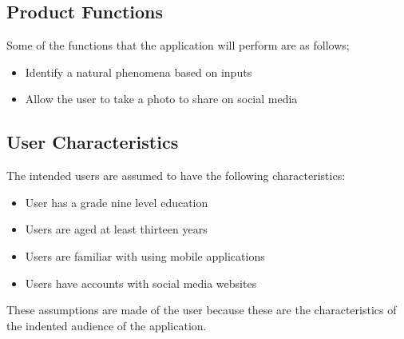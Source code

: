 \documentclass[]{article}
\begin{document}
\subsection{Product Functions}
\label{sub:product_functions}
Some of the functions that the application will perform are as follows;
\begin{itemize}
\item Identify a natural phenomena based on inputs
\item Allow the user to take a photo to share on social media
\end{itemize}

\subsection{User Characteristics}
\label{sub:user_characteristics}
The intended users are assumed to have the following characteristics:
\begin{itemize}
	\item User has a grade nine level education
	\item Users are aged at least thirteen years
	\item Users are familiar with using mobile applications
	\item Users have accounts with social media websites 
	  
\end{itemize}
These assumptions are made of the user because these are the characteristics of the indented audience of the application. 
\end{document}
